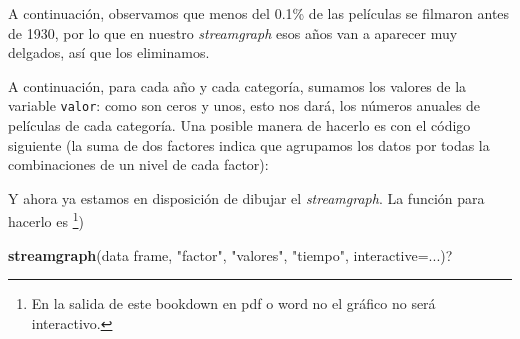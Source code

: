 \documentclass[
]{book}
\newenvironment{Shaded}{\begin{snugshade}}{\end{snugshade}}
\newcommand{\CommentTok}[1]{\textcolor[rgb]{0.56,0.35,0.01}{\textit{#1}}}
\newcommand{\DataTypeTok}[1]{\textcolor[rgb]{0.13,0.29,0.53}{#1}}
\newcommand{\DecValTok}[1]{\textcolor[rgb]{0.00,0.00,0.81}{#1}}
\newcommand{\FloatTok}[1]{\textcolor[rgb]{0.00,0.00,0.81}{#1}}
\newcommand{\KeywordTok}[1]{\textcolor[rgb]{0.13,0.29,0.53}{\textbf{#1}}}
\newcommand{\NormalTok}[1]{#1}
\newcommand{\OperatorTok}[1]{\textcolor[rgb]{0.81,0.36,0.00}{\textbf{#1}}}
\newcommand{\StringTok}[1]{\textcolor[rgb]{0.31,0.60,0.02}{#1}}
\theoremstyle{definition}
\theoremstyle{definition}
\theoremstyle{definition}
\theoremstyle{remark}
\begin{document}
A continuación, observamos que menos del 0.1\% de las películas se filmaron antes de 1930, por lo que en nuestro \emph{streamgraph} esos años van a aparecer muy delgados, así que los eliminamos.

\begin{Shaded}
\end{Shaded}

A continuación, para cada año y cada categoría, sumamos los valores de la variable \texttt{valor}: como son ceros y unos, esto nos dará, los números anuales de películas de cada categoría. Una posible manera de hacerlo es con el código siguiente (la suma de dos factores indica que agrupamos los datos por todas la combinaciones de un nivel de cada factor):

\begin{Shaded}
\end{Shaded}

Y ahora ya estamos en disposición de dibujar el \emph{streamgraph}. La función para hacerlo es \footnote{En la salida de este bookdown en pdf o word no el gráfico no será  interactivo.})

\begin{Shaded}
\begin{Highlighting}[]
\KeywordTok{streamgraph}\NormalTok{(data frame, }\StringTok{"factor"}\NormalTok{, }\StringTok{"valores"}\NormalTok{, }\StringTok{"tiempo"}\NormalTok{, }\DataTypeTok{interactive=}\NormalTok{...)? }
\end{Highlighting}
\end{Shaded}
\end{document}
